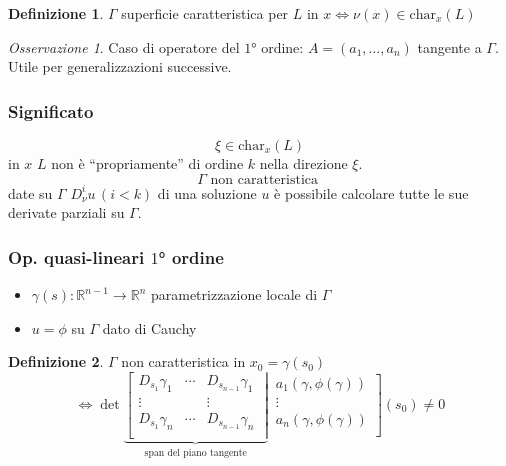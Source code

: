 \documentclass[serif,notheorems]{beamer}
\theoremstyle{definition} %
\newtheorem{definition}{Definizione}[section] %
\theoremstyle{remark}
\newtheorem*{remark}{Osservazione}
\begin{document}
\begin{frame}
\begin{definition}
$\Gamma$ superficie caratteristica per $L$ in $x \iff \nu(x) \in\text{char}_x (L)$
\end{definition}
\begin{remark}
Caso di operatore del $1$° ordine: $A=(a_1,\ldots ,a_n)$ tangente a $\Gamma$.\\
Utile per generalizzazioni successive.
\end{remark}
\end{frame}

\begin{frame}
\frametitle{Significato}
$$\xi \in \text{char}_x (L)$$
in $x$ $L$ non è ``propriamente'' di ordine $k$ nella direzione $\xi$.
\vspace{5mm}
$$\Gamma \text{ non caratteristica }$$ 
date su $\Gamma$ $D^i_\nu u \,(i<k)$ di una soluzione $u$
è possibile calcolare tutte le sue derivate parziali su $\Gamma$.
\end{frame}

\begin{frame}
\frametitle{Op. quasi-lineari $1$° ordine}
\begin{itemize}
\item $\gamma (s): \mathbb{R}^{n-1}\rightarrow \mathbb{R}^n$ parametrizzazione locale di $\Gamma$
\item $u = \phi$ su $\Gamma$ dato di Cauchy
\end{itemize}
\begin{definition}
$\Gamma$ non caratteristica in $x_0=\gamma (s_0)$\\
\begin{equation*}
\iff \det
\underbrace{
\left[
\begin{matrix}
D_{s_1}\gamma_1 & \cdots & D_{s_{n-1}}\gamma_1 \\
\vdots &  & \vdots \\
D_{s_1}\gamma_n & \cdots & D_{s_{n-1}}\gamma_n \\
\end{matrix}\;\right|}_{\text{span del piano tangente}} \,
\left.
\begin{matrix}
a_1(\gamma, \phi(\gamma))\\
\vdots\\
a_n(\gamma, \phi(\gamma))\\
\end{matrix}\right] (s_0) \neq 0
\end{equation*}
\end{definition}
\end{frame}
\end{document}
